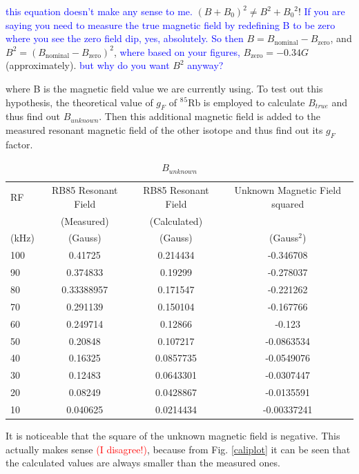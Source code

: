 \documentclass[prb,preprint]{revtex4-1}
\begin{document}
\textcolor{blue}{this equation doesn't make any sense to me.} $(B + B_0)^2 \neq B^2 + {B_0}^2$!   \textcolor{blue}{If you are saying you need to measure the true magnetic field by redefining B to be zero where you see the zero field dip, yes, absolutely. So then} $B = B_{\textrm{nominal}} - B_{\textrm{zero}}$, and $B^2 = (B_{\textrm{nominal}} - B_{\textrm{zero}})^2$, \textcolor{blue}{where based on your figures,} $B_{\textrm{zero}} = -0.34 G$  (approximately). \textcolor{blue}{but why do you want }$B^2$ \textcolor{blue}{anyway?}


where B is the magnetic field value we are currently using. To test out this hypothesis, the theoretical value of $g_{F}$ of $^8$$^5$Rb is employed to calculate $B_{true}$ and thus find out $B_{unknown}$. Then this additional magnetic field is added to the measured resonant magnetic field of the other isotope and thus find out its $g_{F}$ factor. \\

\begin{table}[h]
\centering
\caption{$B_{unknown}$}
\begin{ruledtabular}
\begin{tabular}{ l c c c}
RF & RB85 Resonant Field & RB85 Resonant Field & Unknown Magnetic Field squared\\
 & (Measured) & (Calculated) & \\
(kHz) & (Gauss) & (Gauss) & (Gauss$^{2}$)\\
\hline
100 & 0.41725 & 0.214434 & -0.346708\\
90 & 0.374833 & 0.19299 & -0.278037\\
80 & 0.33388957 & 0.171547 & -0.221262\\
70 & 0.291139 & 0.150104 & -0.167766\\
60 & 0.249714 & 0.12866 & -0.123\\
50 & 0.20848 & 0.107217 & -0.0863534\\
40 & 0.16325 & 0.0857735 & -0.0549076\\
30 & 0.12483 & 0.0643301 & -0.0307447\\
20 &	0.08249 & 0.0428867 & -0.0135591\\
10 &	0.040625 & 0.0214434 & -0.00337241\\

\end{tabular}
\end{ruledtabular}
\label{calibration}
\end{table}

It is noticeable that the square of the unknown magnetic field is negative. This actually makes sense \textcolor{red}{(I disagree!)}, because from Fig. \ref{caliplot} it can be seen that the calculated values are always smaller than the measured ones. 
\end{document}
